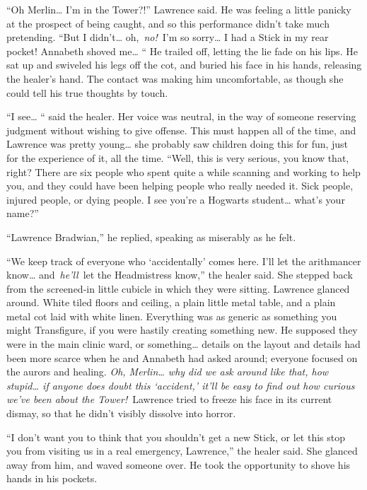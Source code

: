 ``Oh Merlin\ldots{} I'm in the Tower?!'' Lawrence said. He was feeling a
little panicky at the prospect of being caught, and so this performance
didn't take much pretending. ``But I didn't\ldots{} oh,~\emph{no!}~I'm
so sorry\ldots{} I had a Stick in my rear pocket! Annabeth shoved
me\ldots{} `` He trailed off, letting the lie fade on his lips. He sat
up and swiveled his legs off the cot, and buried his face in his hands,
releasing the healer's hand. The contact was making him uncomfortable,
as though she could tell his true thoughts by touch.

``I see\ldots{} `` said the healer. Her voice was neutral, in the way of
someone reserving judgment without wishing to give offense. This must
happen all of the time, and Lawrence was pretty young\ldots{} she
probably saw children doing this for fun, just for the experience of it,
all the time. ``Well, this is very serious, you know that, right? There
are six people who spent quite a while scanning and working to help you,
and they could have been helping people who really needed it. Sick
people, injured people, or dying people. I see you're a Hogwarts
student\ldots{} what's your name?''

``Lawrence Bradwian,'' he replied, speaking as miserably as he felt.

``We keep track of everyone who `accidentally' comes here. I'll let the
arithmancer know\ldots{} and~\emph{he'll}~let the Headmistress know,''
the healer said. She stepped back from the screened-in little cubicle in
which they were sitting. Lawrence glanced around. White tiled floors and
ceiling, a plain little metal table, and a plain metal cot laid with
white linen. Everything was as generic as something you might
Transfigure, if you were hastily creating something new. He supposed
they were in the main clinic ward, or something\ldots{} details on the
layout and details had been more scarce when he and Annabeth had asked
around; everyone focused on the aurors and healing. \emph{Oh,
Merlin\ldots{} why did we ask around like that, how stupid\ldots{} if
anyone does doubt this `accident,' it'll be easy to find out how curious
we've been about the Tower!}~Lawrence tried to freeze his face in its
current dismay, so that he didn't visibly dissolve into horror.

``I don't want you to think that you shouldn't get a new Stick, or let
this stop you from visiting us in a real emergency, Lawrence,'' the
healer said. She glanced away from him, and waved someone over. He took
the opportunity to shove his hands in his pockets.

